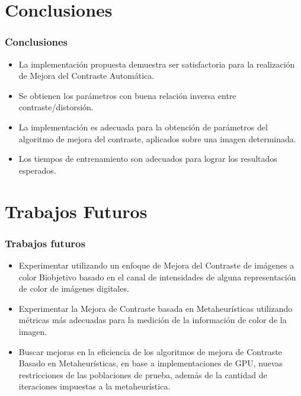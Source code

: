 \documentclass[usenames,dvipsnames]{beamer}
\begin{document}
\section{Conclusiones}

\begin{frame}
\frametitle{Conclusiones} 
\begin{exampleblock}{}
\begin{itemize}
	\item La implementación propuesta demuestra ser satisfactoria para la realización de Mejora del Contraste Automática.
	\item Se obtienen los parámetros con buena relación inversa entre contraste/distorsión.
	\item La implementación es adecuada para la obtención de parámetros del algoritmo de mejora del contraste, aplicados sobre una imagen determinada.
	\item Los tiempos de entrenamiento son adecuados para lograr los resultados esperados.
\end{itemize}
\end{exampleblock}
\end{frame}


\section{Trabajos Futuros}

\begin{frame}
\frametitle{Trabajos futuros} 
\begin{exampleblock}{}
\begin{itemize}
	\item Experimentar utilizando un enfoque de Mejora del Contraste de imágenes a color Biobjetivo basado en el canal de intensidades de alguna representación de color de imágenes digitales.
	\item Experimentar la Mejora de Contraste basada en Metaheurísticas utilizando métricas más adecuadas para la medición de la información de color de la imagen.
	\item Buscar mejoras en la eficiencia de los algoritmos de mejora de Contraste Basado en Metaheurísticas, en base a implementaciones de GPU, nuevas restricciones de las poblaciones de prueba, además de la cantidad de iteraciones impuestas a la metaheurística.
\end{itemize}
\end{exampleblock}
\end{frame}
\end{document}
